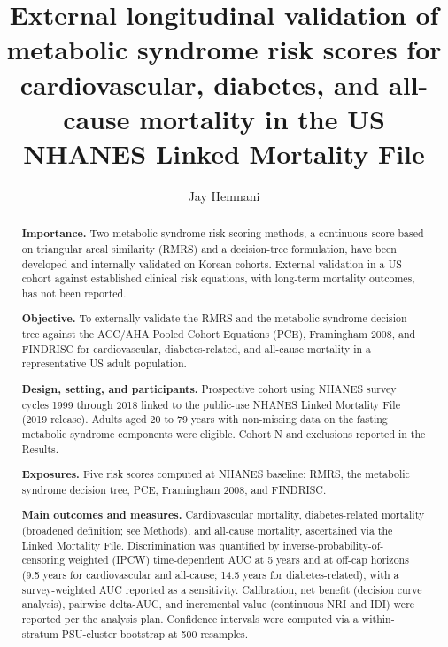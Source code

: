 \documentclass[11pt]{article}
\title{External longitudinal validation of metabolic syndrome risk scores for cardiovascular, diabetes, and all-cause mortality in the US NHANES Linked Mortality File}
\author[1]{Jay Hemnani}
\affil[1]{Independent researcher. Correspondence: jayhemnani992000@gmail.com.}
\date{}
\begin{document}
\maketitle

\begin{abstract}
\noindent \textbf{Importance.} Two metabolic syndrome risk scoring methods, a continuous score based on triangular areal similarity (RMRS) and a decision-tree formulation, have been developed and internally validated on Korean cohorts. External validation in a US cohort against established clinical risk equations, with long-term mortality outcomes, has not been reported.

\noindent \textbf{Objective.} To externally validate the RMRS and the metabolic syndrome decision tree against the ACC/AHA Pooled Cohort Equations (PCE), Framingham 2008, and FINDRISC for cardiovascular, diabetes-related, and all-cause mortality in a representative US adult population.

\noindent \textbf{Design, setting, and participants.} Prospective cohort using NHANES survey cycles 1999 through 2018 linked to the public-use NHANES Linked Mortality File (2019 release). Adults aged 20 to 79 years with non-missing data on the fasting metabolic syndrome components were eligible. Cohort N and exclusions reported in the Results.

\noindent \textbf{Exposures.} Five risk scores computed at NHANES baseline: RMRS, the metabolic syndrome decision tree, PCE, Framingham 2008, and FINDRISC.

\noindent \textbf{Main outcomes and measures.} Cardiovascular mortality, diabetes-related mortality (broadened definition; see Methods), and all-cause mortality, ascertained via the Linked Mortality File. Discrimination was quantified by inverse-probability-of-censoring weighted (IPCW) time-dependent AUC at 5 years and at off-cap horizons (9.5 years for cardiovascular and all-cause; 14.5 years for diabetes-related), with a survey-weighted AUC reported as a sensitivity. Calibration, net benefit (decision curve analysis), pairwise delta-AUC, and incremental value (continuous NRI and IDI) were reported per the analysis plan. Confidence intervals were computed via a within-stratum PSU-cluster bootstrap at 500 resamples.


\end{abstract}
\end{document}

